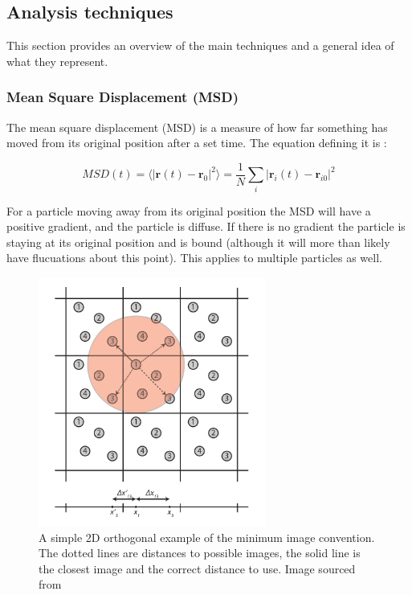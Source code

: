 \documentclass[a4paper,12pt]{article}
\begin{document}
\subsection{Analysis techniques}

This section provides an overview of the main techniques and a general idea of what they represent.

\subsubsection{Mean Square Displacement (MSD)}

The mean square displacement (MSD) is a measure of how far something has moved from its original position after a set time. The equation defining it is \cite{Compmod}:

\smallskip
\begin{equation}
MSD(t) = \langle |\textbf{r}(t) - \textbf{r}_0 |^2 \rangle = \frac{1}{N} \sum_{i}^{} |\textbf{r}_i(t) - \textbf{r}_{i0} |^2
\end{equation}
\smallskip

For a particle moving away from its original position the MSD will have a positive gradient, and the particle is diffuse. If there is no gradient the particle is staying at its original position and is bound (although it will more than likely have flucuations about this point). This applies to multiple particles as well.

\begin{figure}[h!!!!!!!!!!!!!!!!!!!!!!!!!!]
	\centering
	\includegraphics[width=7.5cm]{figures/minimag.png}
	\caption{A simple 2D orthogonal example of the minimum image convention. The dotted lines are distances to possible images, the solid line is the closest image and the correct distance to use. Image sourced from \cite{Compmod}}
	\label{Fig6}
\end{figure}
\end{document}
